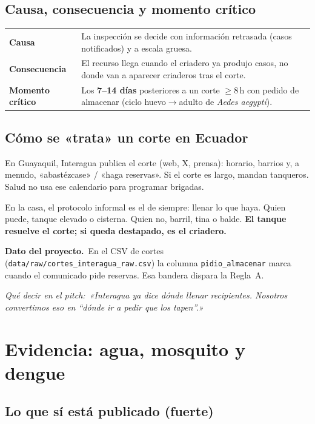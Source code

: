 \documentclass[11pt,a4paper]{article}
\newcommand{\nota}[2]{%
  \par\vspace{4pt}\noindent
  \colorbox{panelvs}{\parbox{\dimexpr\linewidth-2\fboxsep}{%
  \textbf{\color{azulvs}#1.}\ #2}}\par\vspace{4pt}}
\newcommand{\pitch}[1]{%
  \par\vspace{2pt}\noindent
  \textit{\textcolor{azulvs}{Qué decir en el pitch:}\ #1}\par\vspace{4pt}}
\begin{document}
\subsection{Causa, consecuencia y momento crítico}

\begin{tabularx}{\linewidth}{@{}>{\bfseries}p{3.2cm}Y@{}}
\toprule
Causa & La inspección se decide con información retrasada (casos
notificados) y a escala gruesa.\\
Consecuencia & El recurso llega cuando el criadero ya produjo casos, no
donde van a aparecer criaderos tras el corte.\\
Momento crítico & Los \textbf{7--14 días} posteriores a un corte
$\geq 8$\,h con pedido de almacenar (ciclo huevo$\to$adulto de
\textit{Aedes aegypti}).\\
\bottomrule
\end{tabularx}

\subsection{Cómo se «trata» un corte en Ecuador}

En Guayaquil, Interagua publica el corte (web, X, prensa): horario,
barrios y, a menudo, «abastézcase» / «haga reservas». Si el corte es
largo, mandan tanqueros. Salud no usa ese calendario para programar
brigadas.

En la casa, el protocolo informal es el de siempre: llenar lo que haya.
Quien puede, tanque elevado o cisterna. Quien no, barril, tina o balde.
\textbf{El tanque resuelve el corte; si queda destapado, es el
criadero.}

\nota{Dato del proyecto}{En el CSV de cortes
(\texttt{data/raw/cortes\_interagua\_raw.csv}) la columna
\texttt{pidio\_almacenar} marca cuando el comunicado pide reservas.
Esa bandera dispara la Regla~A.}

\pitch{«Interagua ya dice dónde llenar recipientes. Nosotros convertimos
eso en ``dónde ir a pedir que los tapen''.»}

\section{Evidencia: agua, mosquito y dengue}

\subsection{Lo que sí está publicado (fuerte)}
\end{document}
